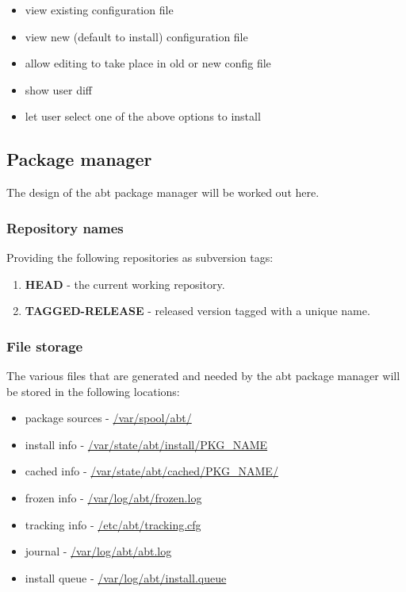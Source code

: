 \begin{itemize}
  \item view existing configuration file
  \item view new (default to install) configuration file
  \item allow editing to take place in old or new config file
  \item show user diff
  \item let user select one of the above options to install
\end{itemize}


\subsection{Package manager}
The design of the abt package manager will be worked out here.

\subsubsection{Repository names}
Providing the following repositories as subversion tags:

\begin{enumerate}
  \item \textbf{HEAD} - the current working repository.
  \item \textbf{TAGGED-RELEASE} - released version tagged with a unique name.
\end{enumerate}

\subsubsection{File storage}
The various files that are generated and needed by the abt package manager will be stored in the following locations:

\begin{itemize}
  \item package sources - \url{/var/spool/abt/}
  \item install info - \url{/var/state/abt/install/PKG_NAME}
  \item cached info - \url{/var/state/abt/cached/PKG_NAME/}
  \item frozen info - \url{/var/log/abt/frozen.log}
  \item tracking info - \url{/etc/abt/tracking.cfg}
  \item journal - \url{/var/log/abt/abt.log}
  \item install queue - \url{/var/log/abt/install.queue}
\end{itemize}
